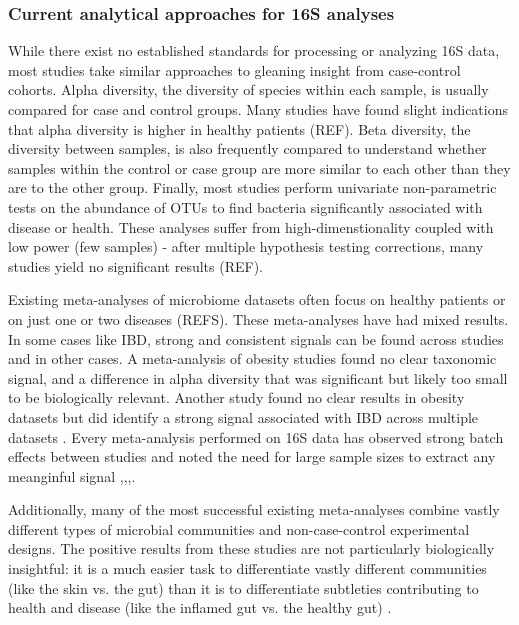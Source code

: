 \documentclass[12pt]{article}
\begin{document}
\subsubsection{Current analytical approaches for 16S analyses}
While there exist no established standards for processing or analyzing 16S data, most studies take similar approaches to gleaning insight from case-control cohorts. Alpha diversity, the diversity of species within each sample, is usually compared for case and control groups. Many studies have found slight indications that alpha diversity is higher in healthy patients (REF). Beta diversity, the diversity between samples, is also frequently compared to understand whether samples within the control or case group are more similar to each other than they are to the other group. Finally, most studies perform univariate non-parametric tests on the abundance of OTUs to find bacteria significantly associated with disease or health. These analyses suffer from high-dimenstionality coupled with low power (few samples) - after multiple hypothesis testing corrections, many studies yield no significant results (REF).

Existing meta-analyses of microbiome datasets often focus on healthy patients or on just one or two diseases (REFS). These meta-analyses have had mixed results. In some cases like IBD, strong and consistent signals can be found across studies and in other cases. A meta-analysis of obesity studies found no clear taxonomic signal, and a difference in alpha diversity that was significant but likely too small to be biologically relevant\cite{sze-signal-2016}. Another study found no clear results in obesity datasets but did identify a strong signal associated with IBD across multiple datasets \cite{walters-ob_meta-2014}. Every meta-analysis performed on 16S data has observed strong batch effects between studies and noted the need for large sample sizes to extract any meanginful signal \cite{sze-signal-2016},\cite{walters-ob_meta-2014},\cite{knights-supervised-2010},\cite{lozupone-meta-2013}. 

Additionally, many of the most successful existing meta-analyses combine vastly different types of microbial communities and non-case-control experimental designs. The positive results from these studies are not particularly biologically insightful: it is a much easier task to differentiate vastly different communities (like the skin vs. the gut) than it is to differentiate subtleties contributing to health and disease (like the inflamed gut vs. the healthy gut) \cite{knights-supervised-2010}.
\end{document}
